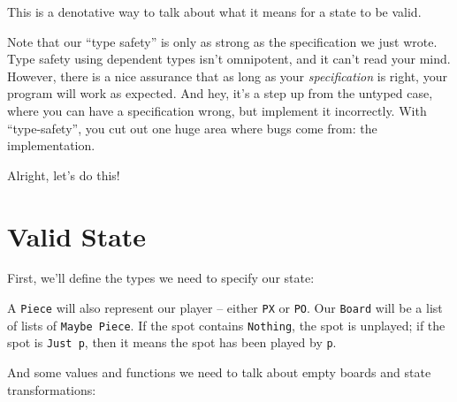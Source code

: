 \documentclass[]{article}
\newenvironment{Shaded}{}{}
\newcommand{\NormalTok}[1]{#1}
\newcommand{\OperatorTok}[1]{\textcolor[rgb]{0.40,0.40,0.40}{#1}}
\begin{document}
This is a denotative way to talk about what it means for a state to be valid.

Note that our ``type safety'' is only as strong as the specification we just
wrote. Type safety using dependent types isn't omnipotent, and it can't read
your mind. However, there is a nice assurance that as long as your
\emph{specification} is right, your program will work as expected. And hey, it's
a step up from the untyped case, where you can have a specification wrong, but
implement it incorrectly. With ``type-safety'', you cut out one huge area where
bugs come from: the implementation.

Alright, let's do this!

\section{Valid State}\label{valid-state}

First, we'll define the types we need to specify our state:

\begin{Shaded}
\end{Shaded}

A \texttt{Piece} will also represent our player -- either \texttt{PX} or
\texttt{PO}. Our \texttt{Board} will be a list of lists of
\texttt{Maybe\ Piece}. If the spot contains \texttt{Nothing}, the spot is
unplayed; if the spot is \texttt{Just\ p}, then it means the spot has been
played by \texttt{p}.

And some values and functions we need to talk about empty boards and state
transformations:

\begin{Shaded}
\end{Shaded}
\end{document}
